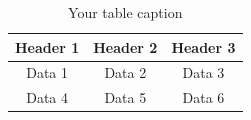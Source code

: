 \begin{table}[htbp]
    \centering
    \caption{Your table caption}
    \label{tab:2-1}
    \begin{tabular}{ccc} %
        \toprule %
        Header 1 & Header 2 & Header 3 \\
        \midrule %
        Data 1 & Data 2 & Data 3 \\
        Data 4 & Data 5 & Data 6 \\
        \bottomrule %
    \end{tabular}
\end{table}

\clearpage
\null
\clearpage